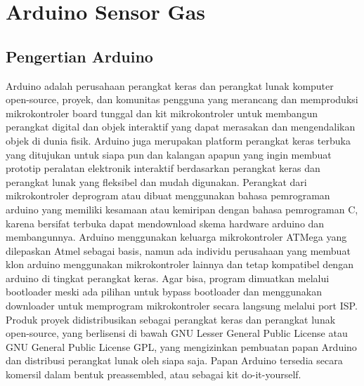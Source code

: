 \section{Arduino Sensor Gas}
\subsection{Pengertian Arduino}
Arduino adalah perusahaan perangkat keras dan perangkat lunak komputer open-source, proyek, dan komunitas pengguna yang merancang dan memproduksi mikrokontroler board tunggal dan kit mikrokontroler untuk membangun perangkat digital dan objek interaktif yang dapat merasakan dan mengendalikan objek di dunia fisik.
Arduino juga merupakan platform perangkat keras terbuka yang ditujukan untuk siapa pun dan kalangan apapun yang ingin membuat prototip peralatan elektronik interaktif berdasarkan perangkat keras dan perangkat lunak yang fleksibel dan mudah digunakan. Perangkat dari mikrokontroler deprogram atau dibuat menggunakan bahasa pemrograman arduino yang memiliki kesamaan atau kemiripan dengan bahasa pemrograman C, karena bersifat terbuka dapat mendownload skema hardware arduino dan membangunnya. 
Arduino menggunakan keluarga mikrokontroler ATMega yang dilepaskan Atmel sebagai basis, namun ada individu perusahaan yang membuat klon arduino menggunakan mikrokontroler lainnya dan tetap kompatibel dengan arduino di tingkat perangkat keras. Agar bisa, program dimuatkan melalui bootloader meski ada pilihan untuk bypass bootloader dan menggunakan downloader untuk memprogram mikrokontroler secara langsung melalui port ISP.
Produk proyek didistribusikan sebagai perangkat keras dan perangkat lunak open-source, yang berlisensi di bawah GNU Lesser General Public License atau GNU General Public License GPL, yang mengizinkan pembuatan papan Arduino dan distribusi perangkat lunak oleh siapa saja. Papan Arduino tersedia secara komersil dalam bentuk preassembled, atau sebagai kit do-it-yourself. 
